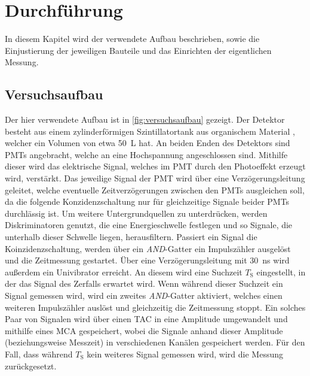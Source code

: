 \section{Durchführung}
\label{sec:durchfuehrung}

In diesem Kapitel wird der verwendete Aufbau beschrieben,
sowie die Einjustierung der jeweiligen Bauteile und das Einrichten der eigentlichen Messung.


\subsection{Versuchsaufbau}

Der hier verwendete Aufbau ist in \autoref{fig:versuchsaufbau} gezeigt.
Der Detektor besteht aus einem zylinderförmigen Szintillatortank aus organischem Material \cite{kolanoskiwermes},
welcher ein Volumen von etwa \SI{50}{\liter} hat.
An beiden Enden des Detektors sind \acp{PMT} \cite{wrleo} angebracht,
welche an eine Hochspannung angeschlossen sind.
Mithilfe dieser wird das elektrische Signal,
welches im \ac{PMT} durch den Photoeffekt erzeugt wird,
verstärkt.
Das jeweilige Signal der \ac{PMT} wird über eine Verzögerungsleitung geleitet,
welche eventuelle Zeitverzögerungen zwischen den \acp{PMT} ausgleichen soll,
da die folgende Konzidenzschaltung nur für gleichzeitige Signale beider \acp{PMT} durchlässig ist.
Um weitere Untergrundquellen zu unterdrücken,
werden Diskriminatoren genutzt,
die eine Energieschwelle festlegen und so Signale,
die unterhalb dieser Schwelle liegen,
herausfiltern.
Passiert ein Signal die Koinzidenzschaltung,
werden über ein \textit{AND}-Gatter ein Impulszähler ausgelöst und die Zeitmessung gestartet.
Über eine Verzögerungsleitung mit \SI{30}{\nano\second} wird außerdem ein Univibrator erreicht.
An diesem wird eine Suchzeit $T_\text{S}$ eingestellt,
in der das Signal des Zerfalls erwartet wird.
Wenn während dieser Suchzeit ein Signal gemessen wird,
wird ein zweites \textit{AND}-Gatter aktiviert,
welches einen weiteren Impulszähler auslöst und gleichzeitig die Zeitmessung stoppt.
Ein solches Paar von Signalen wird über einen \ac{TAC} \cite{wrleo} in eine Amplitude umgewandelt und mithilfe eines \ac{MCA} \cite{wrleo} gespeichert, %
wobei die Signale anhand dieser Amplitude (beziehungsweise Messzeit)
in verschiedenen Kanälen gespeichert werden.
Für den Fall,
dass während $T_\text{S}$ kein weiteres Signal gemessen wird,
wird die Messung zurückgesetzt.

